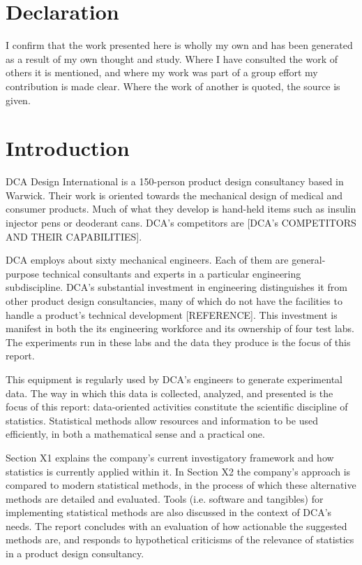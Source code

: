 \documentclass[11pt,a4paper,article]{memoir} %
\begin{document}
\chapter*{\large Declaration}
\vspace*{-\baselineskip}
I confirm that the work presented here is wholly my own and has been generated as a result of my own thought and study. Where I have consulted the work of others it is mentioned, and where my work was part of a group effort my contribution is made clear. Where the work of another is quoted, the source is given.



\newpage
\chapter{Introduction}
DCA Design International is a 150-person product design consultancy based in Warwick. Their work is oriented towards the mechanical design of medical and consumer products. Much of what they develop is hand-held items such as insulin injector pens or deoderant cans. DCA's competitors are [DCA's COMPETITORS AND THEIR CAPABILITIES].
\par
DCA employs about sixty mechanical engineers. Each of them are general-purpose technical consultants and experts in a particular engineering subdiscipline. DCA's substantial investment in engineering distinguishes it from other product design consultancies, many of which do not have the facilities to handle a product's technical development [REFERENCE]. This investment is manifest in both the its engineering workforce and its ownership of four test labs. The experiments run in these labs and the data they produce is the focus of this report. 
\par
This equipment is regularly used by DCA's engineers to generate experimental data. The way in which this data is collected, analyzed, and presented is the focus of this report: data-oriented activities constitute the scientific discipline of statistics. Statistical methods allow resources and information to be used efficiently, in both a mathematical sense and a practical one.
\par
Section X1 explains the company's current investigatory framework and how statistics is currently applied within it. In Section X2 the company's approach is compared to modern statistical methods, in the process of which these alternative methods are detailed and evaluated. Tools (i.e. software and tangibles) for implementing statistical methods are also discussed in the context of DCA's needs. The report concludes with an evaluation of how actionable the suggested methods are, and responds to hypothetical criticisms of the relevance of statistics in a product design consultancy.
\end{document}
